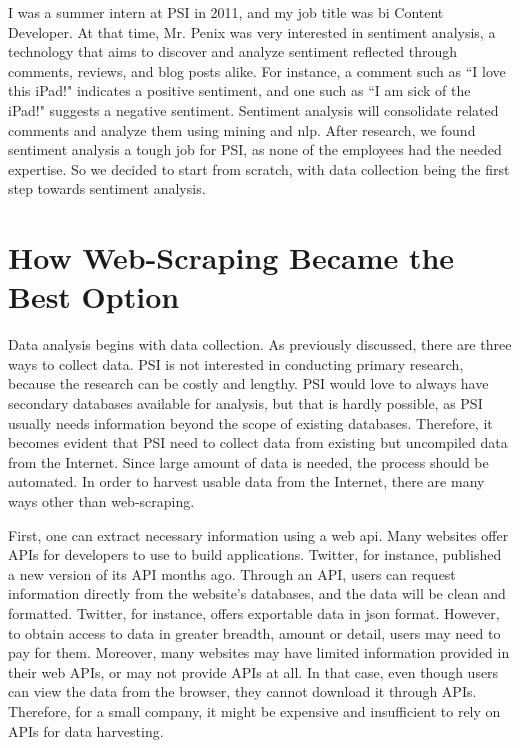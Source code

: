 \documentclass[12pt]{report}
\begin{document}
I was a summer intern at PSI in 2011, and my job title was \gls{bi} Content Developer. At that time, Mr. Penix was very interested in sentiment analysis, a technology that aims to discover and analyze sentiment reflected through comments, reviews, and blog posts alike. For instance, a comment such as ``I love this iPad!" indicates a positive sentiment, and one such as ``I am sick of the iPad!" suggests a negative sentiment. Sentiment analysis will consolidate related comments and analyze them using \gls{mining} and \gls{nlp}. After research, we found sentiment analysis a tough job for PSI, as none of the employees had the needed expertise. So we decided to start from scratch, with data collection being the first step towards sentiment analysis.

\section{How Web-Scraping Became the Best Option}

Data analysis begins with data collection. As previously discussed, there are three ways to collect data. PSI is not interested in conducting primary research, because the research can be costly and lengthy. PSI would love to always have secondary databases available for analysis, but that is hardly possible, as PSI usually needs information beyond the scope of existing databases. Therefore, it becomes evident that PSI need to collect data from existing but uncompiled data from the Internet. Since large amount of data is needed, the process should be automated. In order to \gls{harvest} usable data from the Internet, there are many ways other than web-scraping.

First, one can extract necessary information using a web \gls{api}. Many websites offer APIs for developers to use to build applications. Twitter, for instance, published a new version of its API months ago. Through an API, users can request information directly from the website's databases, and the data will be clean and formatted. Twitter, for instance, offers exportable data in \gls{json} format. However, to obtain access to data in greater breadth, amount or detail, users may need to pay for them. Moreover, many websites may have limited information provided in their web APIs, or may not provide APIs at all. In that case, even though users can view the data from the browser, they cannot download it through APIs. Therefore, for a small company, it might be expensive and insufficient to rely on APIs for data harvesting.
\end{document}
